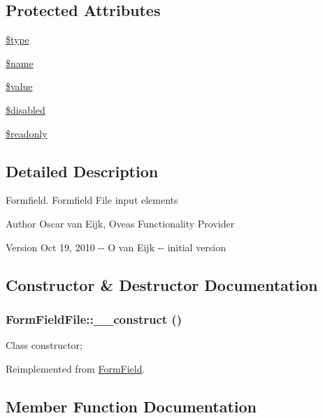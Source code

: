 \subsection*{Protected Attributes}
\begin{DoxyCompactItemize}
\item 
\hyperlink{classFormField_a37bed21a1891e95be0e4a697e45ba51b}{\$type}
\item 
\hyperlink{classFormField_a23861f707bcd77bbace6300de9621746}{\$name}
\item 
\hyperlink{classFormField_a3c01e89834248eec8e2f145fbcfa0fbc}{\$value}
\item 
\hyperlink{classFormField_ab6f1907061890290e32cb2befc0a5f50}{\$disabled}
\item 
\hyperlink{classFormField_a78ba5d4b9127e75e8ccf86f397b5d9ac}{\$readonly}
\end{DoxyCompactItemize}


\subsection{Detailed Description}
Formfield. Formfield File input elements \begin{DoxyAuthor}{Author}
Oscar van Eijk, Oveas Functionality Provider 
\end{DoxyAuthor}
\begin{DoxyVersion}{Version}
Oct 19, 2010 -\/-\/ O van Eijk -\/-\/ initial version 
\end{DoxyVersion}


\subsection{Constructor \& Destructor Documentation}
\subsubsection[{\_\-\_\-construct}]{\setlength{\rightskip}{0pt plus 5cm}FormFieldFile::\_\-\_\-construct ()}\label{classFormFieldFile_a2e19b30454dd3ed054772868bf6eebad}
Class constructor; 

Reimplemented from \hyperlink{classFormField_a0cfe713ce28a6a0cb53476ed463e1f01}{FormField}.



\subsection{Member Function Documentation}
